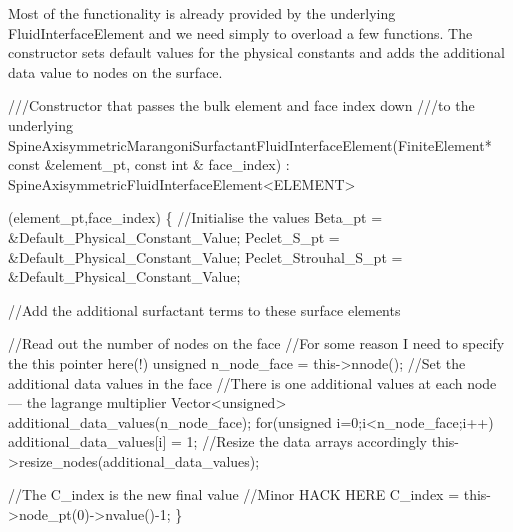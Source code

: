Most of the functionality is already provided by the underlying {\ttfamily Fluid\+Interface\+Element} and we need simply to overload a few functions. The constructor sets default values for the physical constants and adds the additional data value to nodes on the surface. 
\begin{DoxyCodeInclude}
 \textcolor{comment}{///Constructor that passes the bulk element and face index down}
\textcolor{comment}{ ///to the underlying}
\textcolor{comment}{}  SpineAxisymmetricMarangoniSurfactantFluidInterfaceElement(FiniteElement* \textcolor{keyword}{const} &element\_pt, \textcolor{keyword}{const} \textcolor{keywordtype}{int} &
      face\_index) : SpineAxisymmetricFluidInterfaceElement<ELEMENT>
                                                                                                                
             (element\_pt,face\_index)
  \{
   \textcolor{comment}{//Initialise the values}
   Beta\_pt = &Default\_Physical\_Constant\_Value;
   Peclet\_S\_pt = &Default\_Physical\_Constant\_Value;
   Peclet\_Strouhal\_S\_pt = &Default\_Physical\_Constant\_Value;

   \textcolor{comment}{//Add the additional surfactant terms to these surface elements}
   
   \textcolor{comment}{//Read out the number of nodes on the face}
   \textcolor{comment}{//For some reason I need to specify the this pointer here(!)}
   \textcolor{keywordtype}{unsigned} n\_node\_face = this->nnode();
   \textcolor{comment}{//Set the additional data values in the face}
   \textcolor{comment}{//There is one additional values at each node --- the lagrange multiplier}
   Vector<unsigned> additional\_data\_values(n\_node\_face);
   \textcolor{keywordflow}{for}(\textcolor{keywordtype}{unsigned} i=0;i<n\_node\_face;i++) additional\_data\_values[i] = 1;
   \textcolor{comment}{//Resize the data arrays accordingly }
   this->resize\_nodes(additional\_data\_values);

   \textcolor{comment}{//The C\_index is the new final value}
   \textcolor{comment}{//Minor HACK HERE}
   C\_index = this->node\_pt(0)->nvalue()-1;
\}

\end{DoxyCodeInclude}


